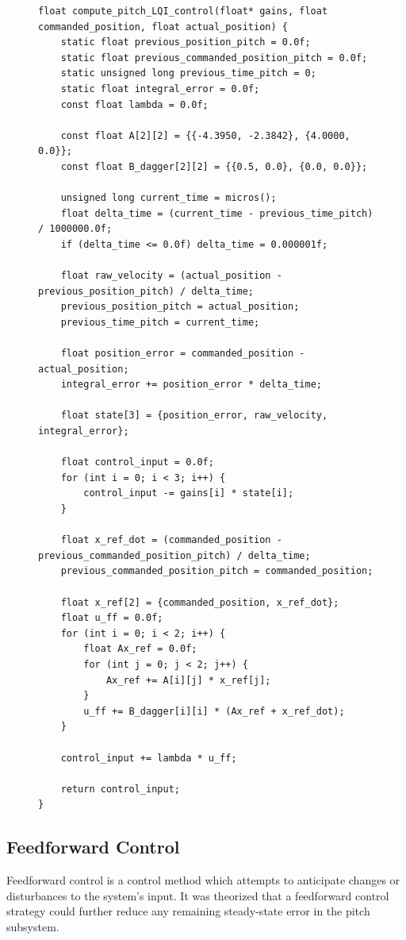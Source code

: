 \begin{figure}[H]
\centering
\begin{lstlisting}[caption={Pitch LQI Control with Feedforward}, label={lst:pitch_lqi_control}]
float compute_pitch_LQI_control(float* gains, float commanded_position, float actual_position) {
    static float previous_position_pitch = 0.0f;
    static float previous_commanded_position_pitch = 0.0f;
    static unsigned long previous_time_pitch = 0;
    static float integral_error = 0.0f;
    const float lambda = 0.0f;

    const float A[2][2] = {{-4.3950, -2.3842}, {4.0000, 0.0}};
    const float B_dagger[2][2] = {{0.5, 0.0}, {0.0, 0.0}};

    unsigned long current_time = micros();
    float delta_time = (current_time - previous_time_pitch) / 1000000.0f;
    if (delta_time <= 0.0f) delta_time = 0.000001f;

    float raw_velocity = (actual_position - previous_position_pitch) / delta_time;
    previous_position_pitch = actual_position;
    previous_time_pitch = current_time;

    float position_error = commanded_position - actual_position;
    integral_error += position_error * delta_time;

    float state[3] = {position_error, raw_velocity, integral_error};

    float control_input = 0.0f;
    for (int i = 0; i < 3; i++) {
        control_input -= gains[i] * state[i];
    }

    float x_ref_dot = (commanded_position - previous_commanded_position_pitch) / delta_time;
    previous_commanded_position_pitch = commanded_position;

    float x_ref[2] = {commanded_position, x_ref_dot};
    float u_ff = 0.0f;
    for (int i = 0; i < 2; i++) {
        float Ax_ref = 0.0f;
        for (int j = 0; j < 2; j++) {
            Ax_ref += A[i][j] * x_ref[j];
        }
        u_ff += B_dagger[i][i] * (Ax_ref + x_ref_dot);
    }

    control_input += lambda * u_ff;

    return control_input;
}
\end{lstlisting}
\end{figure}

\subsection{Feedforward Control}

Feedforward control is a control method which attempts to anticipate changes or disturbances to the system's input. It was theorized that a feedforward control strategy could further reduce any remaining steady-state error in the pitch subsystem.

